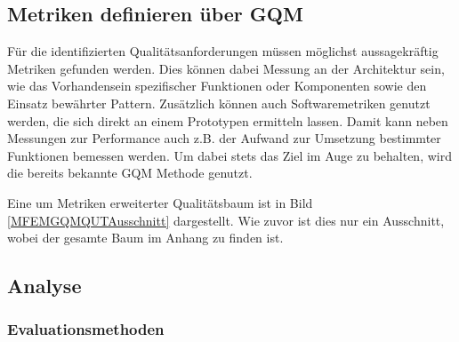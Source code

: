 \subsection{Metriken definieren über \ac{GQM}}

Für die identifizierten Qualitätsanforderungen müssen möglichst aussagekräftig Metriken gefunden werden. Dies können dabei Messung an der Architektur sein, wie das Vorhandensein spezifischer Funktionen oder Komponenten sowie den Einsatz bewährter Pattern. Zusätzlich können auch Softwaremetriken genutzt werden, die sich direkt an einem Prototypen ermitteln lassen. Damit kann neben Messungen zur Performance auch z.B. der Aufwand zur Umsetzung bestimmter Funktionen bemessen werden. Um dabei stets das Ziel im Auge zu behalten, wird die bereits bekannte \ac{GQM} Methode genutzt. 

Eine um Metriken erweiterter Qualitätsbaum ist in Bild \ref{MFEMGQMQUTAusschnitt} dargestellt. Wie zuvor ist dies nur ein Ausschnitt, wobei der gesamte Baum im Anhang zu finden ist.


\pagebreak
\subsection{Analyse}

\subsubsection{Evaluationsmethoden}





\pagebreak
